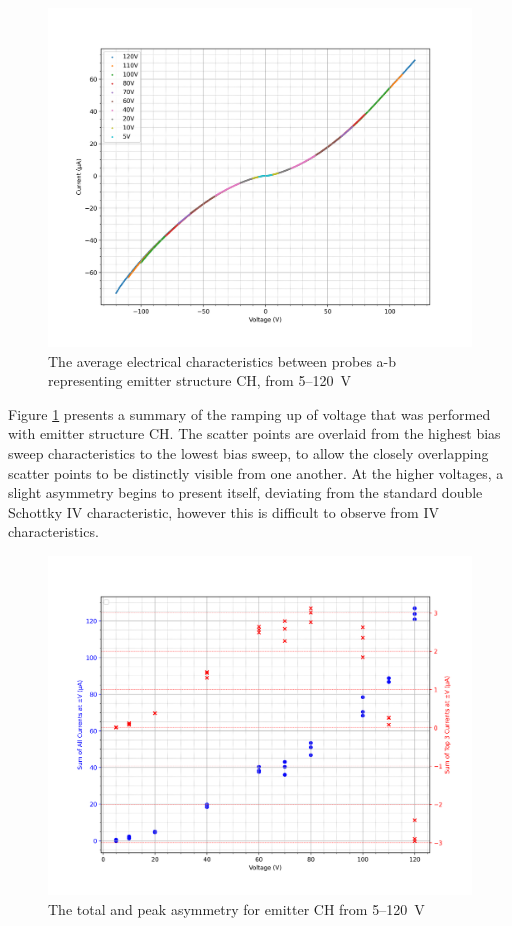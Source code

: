 \begin{refsection}
\begin{figure}[H]
    \centering
    \includegraphics[width=\linewidth]{Chapter7/Figs/Raster/Emitters/5-120V sweeps.png}
    \caption{The average electrical characteristics between probes a-b representing emitter structure CH, from 5--120~\si{\volt}}
    \label{fig:e_ch_5-120v_iv}
\end{figure}

Figure \ref{fig:e_ch_5-120v_iv} presents a summary of the ramping up of voltage that was performed with emitter structure CH. The scatter points are overlaid from the highest bias sweep characteristics to the lowest bias sweep, to allow the closely overlapping scatter points to be distinctly visible from one another. At the higher voltages, a slight asymmetry begins to present itself, deviating from the standard double Schottky IV characteristic, however this is difficult to observe from IV characteristics.

\begin{figure}[H]
    \centering
    \includegraphics[width=\linewidth]{Chapter7/Figs/Raster/Emitters/5-120V asymmetry.png}
    \caption{The total and peak asymmetry for emitter CH from 5--120~\si{\volt}}
    \label{fig:e_ch_5-120v_asymmetry}
\end{figure}


\end{refsection}
